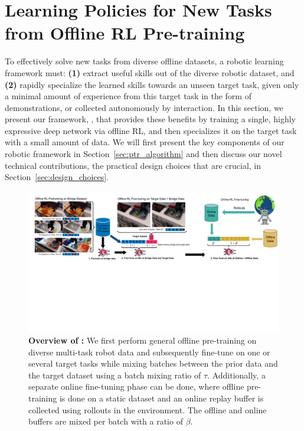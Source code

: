 \vspace{-0.2cm}
\section{Learning Policies for New Tasks from Offline RL Pre-training}
\label{sec:ptr_method}
\vspace{-0.2cm}

To effectively solve new tasks from diverse offline datasets, a robotic learning framework must: \textbf{(1)} extract useful skills out of the diverse robotic dataset, and \textbf{(2)} rapidly specialize the learned skills towards an unseen target task, given only a minimal amount of experience from this target task in the form of demonstrations, or collected autonomously by interaction. In this section, we present our framework, \ptrmethodname, that provides these benefits by training a single, highly expressive deep network via offline RL, and then specializes it on the target task with a small amount of data. We will first present the key components of our robotic framework in Section~\ref{sec:ptr_algorithm} and then discuss our novel technical contributions, the practical design choices that are crucial, in Section~\ref{sec:design_choices}.    

\begin{figure}
  \centering
  \includegraphics[width=1.0\linewidth]{chapters/ptr/system_overview.pdf}
  \vspace{-0.3cm}
  \caption{ \label{fig:system_overview} \footnotesize \textbf{Overview of \ptrmethodname:} We first perform general offline pre-training on diverse multi-task robot data and subsequently fine-tune on one or several target tasks while mixing batches between the prior data and the target dataset using a batch mixing ratio of $\tau$. Additionally, a separate online fine-tuning phase can be done, where offline pre-training is done on a static dataset and an online replay buffer is collected using rollouts in the environment. The offline and online buffers are mixed per batch with a ratio of $\beta$.}
  \vspace{-0.3cm}
\end{figure}

